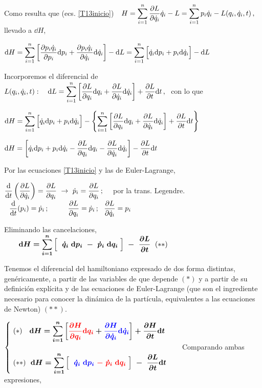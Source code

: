 Como resulta que (ecs. \ref{T13inicio}) $\  \ \displaystyle H=\sum_{i=1}^n \pdv{L}{\dot q_i} \dot q_i - L = \sum_{i=1}^n p_i \dot q_i-L(q_i,\dot q_i,t)\, , \ $ llevado a $\dd H$,


$\displaystyle \dd H = \sum_{i=1}^n \left[
\pdv{p_i \dot q_i}{p_i} \dd p_i + \pdv{p_i \dot q_i}{\dot q_i} \dd \dot q_i
\right] - \dd L =
\sum_{i=1}^n \qty\Big[\dot q_i \dd p_i + p_i \dd \dot q_i] - \dd L$


Incorporemos el diferencial de $L(q_i,\dot q_i,t): \quad \displaystyle \dd L=
\sum_{i=1}^n \left[ \pdv{L}{q_i}\dd q_i + \pdv{L}{\dot q_i} \dd \dot q_i \right] + \pdv{L}{t} \dd t\, , \ $ con lo que

$\displaystyle \dd H = 
\sum_{i=1}^n \qty\Big[\dot q_i \dd p_i + p_i \dd \dot q_i] 
-
\left \{
\sum_{i=1}^n \left[ \pdv{L}{q_i}\dd q_i + \pdv{L}{\dot q_i} \dd \dot q_i \right] + \pdv{L}{t} \dd t
\right\} $

$\displaystyle \dd H = 
\left[
\dot q_i \dd p_i + p_i \dd \dot q_i-\pdv{L}{q_i}\dd q_i -\pdv{L}{\dot q_i} \dd \dot q_i 
\right]
-\pdv{L}{t} \dd t
$

Por las ecuaciones \ref{T13inicio} y las de Euler-Lagrange,

$\displaystyle \dv{t} \left( \pdv{L}{\dot q_i} \right) =\pdv{L}{q_i} \ \to \ \dot p_i=\pdv{L}{q_i}\, ; \quad $  por la trans. Legendre.  $\ \displaystyle \ \dv{t}(p_i)=\dot p_i\, ; \qquad  \ \ \pdv{L}{q_i}=\dot p_i \, ; \ \ \pdv{L}{\dot q_i}=p_i$

Eliminando las cancelaciones, $\boldsymbol{ \qquad \displaystyle \dd H = 
\sum_{i=1}^n \qty\Big[ \ \ \dot q_i \ \dd p_i \ - \ \dot p_i \ \dd  q_i \ ] 
\ - \ \pdv{L}{t} } \ (**)$

Tenemos el diferencial del hamiltoniano expresado de dos forma distintas, genéricamente, a partir de las variables de que depende $(*)$ y a partir de su definición explícita y de las ecuaciones de Euler-Lagrange (que son el ingrediente necesario para conocer la dinámica de la partícula, equivalentes a las ecuaciones de Newton) $(**)$.

$\begin{cases}
\ (*) \ \ \ \boldsymbol{\displaystyle \dd H=\sum_{i=1}^n \left[ \textcolor{red}{\pdv{H}{q_i} \dd q_i} +  \textcolor{blue}{\pdv{H}{\dot q_i} \dd \dot q_i} \right] + \pdv{H}{t} \dd t } 
\\ \\
\ (**)\ \ \boldsymbol{\displaystyle \dd H = 
\sum_{i=1}^n \qty\Big[ \ \  \textcolor{blue}{\dot q_i \ \dd p_i} \  \textcolor{red}{- \ \dot p_i \ \dd  q_i} \ ] 
\ - \ \pdv{L}{t} \dd t } 
\end{cases} \ \ $  Comparando ambas expresiones,

